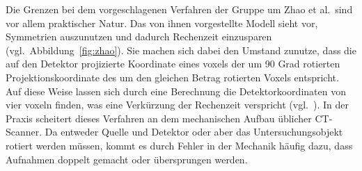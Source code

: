 Die Grenzen bei dem vorgeschlagenen Verfahren der Gruppe um Zhao et al.\ sind vor allem praktischer Natur. Das von ihnen
vorgestellte Modell sieht vor, Symmetrien auszunutzen und dadurch Rechenzeit einzusparen (vgl.\
Abbildung~\ref{fig:zhao}). Sie machen sich dabei den Umstand zunutze, dass die auf den Detektor projizierte Koordinate
eines \gls{voxel}s der um 90 Grad rotierten Projektionskoordinate des um den gleichen Betrag rotierten Voxels
entspricht. Auf diese Weise lassen sich durch eine Berechnung die Detektorkoordinaten von vier \gls{voxel}n finden, was
eine Verkürzung der Rechenzeit verspricht (vgl.~\cite{zhao}). In der Praxis scheitert dieses Verfahren an dem
mechanischen Aufbau üblicher CT-Scanner. Da entweder Quelle und Detektor oder aber das Untersuchungsobjekt rotiert
werden müssen, kommt es durch Fehler in der Mechanik häufig dazu, dass Aufnahmen doppelt gemacht oder übersprungen
werden.

